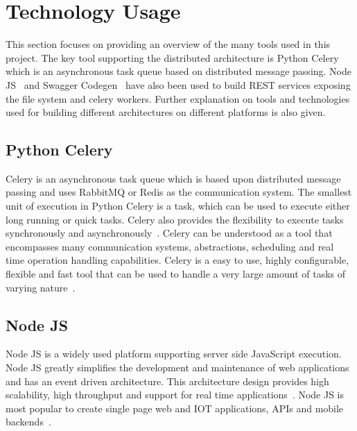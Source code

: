 \section{Technology Usage}

This section focuses on providing an overview of the many tools used in this 
project. The key tool supporting the distributed architecture is Python 
Celery~\cite{hid-sp18-416-www-python-celery} which is an asynchronous task 
queue based on distributed message passing. Node 
JS~\cite{hid-sp18-416-www-nodejs} and Swagger 
Codegen~\cite{hid-sp18-416-www-swagger-codegen} have also been used to build 
REST services exposing the file system and celery workers. Further explanation 
on tools and technologies used for building different architectures on 
different platforms is also given.

\subsection{Python Celery}

Celery is an asynchronous task queue which is based upon distributed message 
passing and uses RabbitMQ or Redis as the communication system. The smallest 
unit of execution in Python Celery is a task, which can be used to execute 
either long running or quick tasks. Celery also provides the flexibility to 
execute tasks synchronously and 
asynchronously~\cite{hid-sp18-416-www-python-celery}. Celery 
can be understood as a tool that encompasses many communication systems, 
abstractions, scheduling and real time operation handling capabilities. Celery 
is a easy to use, highly configurable, flexible and fast tool that can be used 
to handle a very large amount of tasks of varying 
nature~\cite{hid-sp18-416-www-vinta-celery-blog}.

\subsection{Node JS}

Node JS is a widely used platform supporting server side JavaScript execution. 
Node JS greatly simplifies the development and maintenance of web applications 
and has an event driven architecture. This architecture design 
provides high scalability, high throughput and support for real time 
applications~\cite{hid-sp18-416-www-nodejs-wikipedia}. Node JS is most popular 
to create single page web and IOT applications, APIs and mobile 
backends~\cite{hid-sp18-416-www-nodejs-blog}. 

